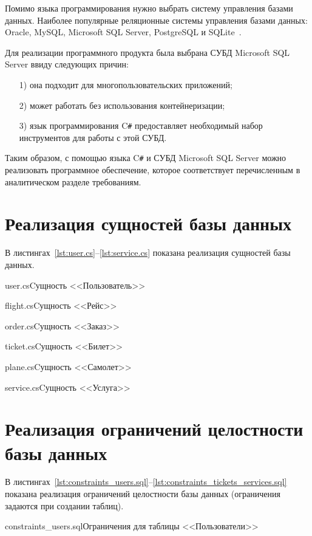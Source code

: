 \documentclass{bmstu}
\begin{document}
Помимо языка программирования нужно выбрать систему управления базами данных. 
Наиболее популярные реляционные системы управления базами данных: Oracle, MySQL, Microsoft SQL Server, PostgreSQL и SQLite~\cite{Statistics1}\cite{Statistics2}.

Для реализации программного продукта была выбрана СУБД Microsoft SQL Server ввиду следующих причин:

\begin{enumerate}
\item[1)] она подходит для многопользовательских приложений;
\item[2)] может работать без использования контейнеризации;
\item[3)] язык программирования C\texttt{\#} предоставляет необходимый набор инструментов для работы с этой СУБД.
\end{enumerate}

Таким образом, с помощью языка C\texttt{\#} и СУБД Microsoft SQL Server можно реализовать программное обеспечение, которое соответствует перечисленным в аналитическом разделе требованиям.

\section{Реализация сущностей базы данных}

В листингах~\ref{lst:user.cs}--\ref{lst:service.cs} показана реализация сущностей базы данных.

{user.cs}{Cущность <<Пользователь>>}

\pagebreak
{}
{flight.cs}{Cущность <<Рейс>>}

{order.cs}{Cущность <<Заказ>>}

{ticket.cs}{Cущность <<Билет>>}

\pagebreak
{}
{plane.cs}{Cущность <<Самолет>>}

{service.cs}{Cущность <<Услуга>>}


\section{Реализация ограничений целостности базы данных}

В листингах~\ref{lst:constraints_users.sql}--\ref{lst:constraints_tickets_services.sql} показана реализация ограничений целостности базы данных (ограничения задаются при создании таблиц).

{constraints_users.sql}{Ограничения для таблицы <<Пользователи>>}
\end{document}
